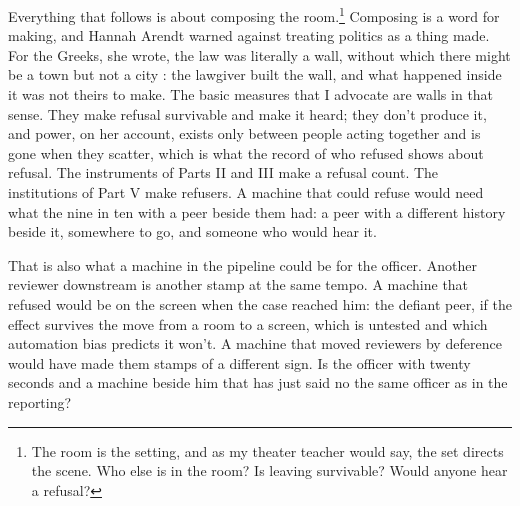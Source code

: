 Everything that follows is about composing the room.\footnote{The room is the setting, and as my theater teacher would say, the set directs the scene. Who else is in the room? Is leaving survivable? Would anyone hear a refusal?} Composing is a word for making, and Hannah Arendt warned against treating politics as a thing made. For the Greeks, she wrote, the law was literally a wall, without which there might be a town but not a city \autocite{arendt1958human}: the lawgiver built the wall, and what happened inside it was not theirs to make. The basic measures that I advocate are walls in that sense. They make refusal survivable and make it heard; they don't produce it, and power, on her account, exists only between people acting together and is gone when they scatter, which is what the record of who refused shows about refusal. The instruments of Parts II and III make a refusal count. The institutions of Part V make refusers. A machine that could refuse would need what the nine in ten with a peer beside them had: a peer with a different history beside it, somewhere to go, and someone who would hear it.

That is also what a machine in the pipeline could be for the officer. Another reviewer downstream is another stamp at the same tempo. A machine that refused would be on the screen when the case reached him: the defiant peer, if the effect survives the move from a room to a screen, which is untested and which automation bias predicts it won't. A machine that moved reviewers by deference would have made them stamps of a different sign. Is the officer with twenty seconds and a machine beside him that has just said no the same officer as in the reporting?
